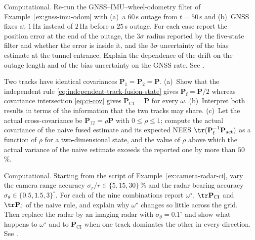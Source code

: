 \begin{prob}\label{prob:ch05:4}
Computational. Re-run the GNSS--IMU--wheel-odometry filter of Example~\ref{ex:gnss-imu-odom} with (a)~a $60$\,s outage from $t=50$\,s and (b)~GNSS fixes at $1$\,Hz instead of $2$\,Hz before a $25$\,s outage. For each case report the position error at the end of the outage, the $3\sigma$ radius reported by the five-state filter and whether the error is inside it, and the $3\sigma$ uncertainty of the bias estimate at the tunnel entrance. Explain the dependence of the drift on the outage length and of the bias uncertainty on the GNSS rate. See .
\end{prob}

\begin{prob}\label{prob:ch05:5}
Two tracks have identical covariances $\mathbf{P}_{1}=\mathbf{P}_{2}=\mathbf{P}$. (a)~Show that the independent rule \eqref{eq:independent-track-fusion-state} gives $\mathbf{P}_{\mathrm{f}}=\mathbf{P}/2$ whereas covariance intersection \eqref{eq:ci-cov} gives $\mathbf{P}_{\mathrm{CI}}=\mathbf{P}$ for every $\omega$. (b)~Interpret both results in terms of the information that the two tracks may share. (c)~Let the actual cross-covariance be $\mathbf{P}_{12}=\rho\mathbf{P}$ with $0\le\rho\le1$; compute the actual covariance of the naive fused estimate and its expected NEES $\tr(\mathbf{P}_{\mathrm{f}}^{-1}\mathbf{P}_{\mathrm{act}})$ as a function of $\rho$ for a two-dimensional state, and the value of $\rho$ above which the actual variance of the naive estimate exceeds the reported one by more than $50$\,\%.
\end{prob}

\begin{prob}\label{prob:ch05:6}
Computational. Starting from the script of Example~\ref{ex:camera-radar-ci}, vary the camera range accuracy $\sigma_{r}/r\in\{5,15,30\}$\,\% and the radar bearing accuracy $\sigma_{\theta}\in\{0.5,1.5,3\}^{\circ}$. For each of the nine combinations report $\omega^{\star}$, $\tr\mathbf{P}_{\mathrm{CI}}$ and $\tr\mathbf{P}_{\mathrm{f}}$ of the naive rule, and explain why $\omega^{\star}$ changes so little across the grid. Then replace the radar by an imaging radar with $\sigma_{\theta}=0.1^{\circ}$ and show what happens to $\omega^{\star}$ and to $\mathbf{P}_{\mathrm{CI}}$ when one track dominates the other in every direction. See .
\end{prob}

